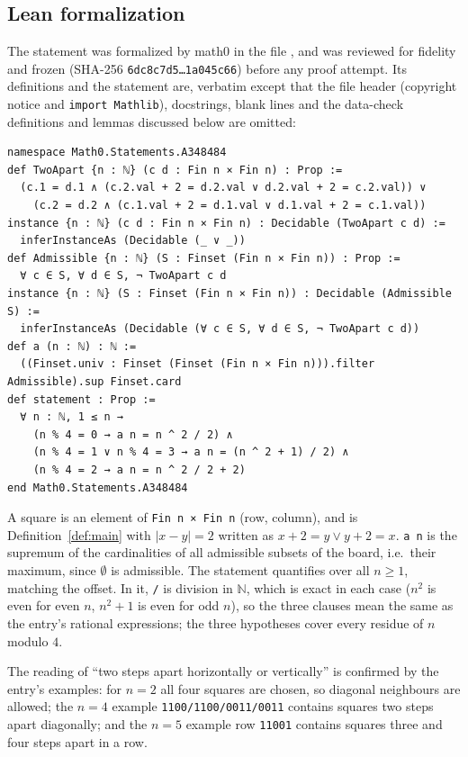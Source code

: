 \documentclass[11pt]{amsart}
\theoremstyle{plain}
\theoremstyle{definition}
\newcommand{\N}{\mathbb{N}}
\begin{document}
\subsection*{Lean formalization}
The statement was formalized by math0 in the file , and was reviewed for fidelity and frozen (SHA-256 \texttt{6dc8c7d5\ldots 1a045c66}) before any proof attempt.
Its definitions and the statement are, verbatim except that the file header (copyright notice and \texttt{import Mathlib}), docstrings, blank lines and the data-check definitions and lemmas discussed below are omitted:
\begin{lstlisting}
namespace Math0.Statements.A348484
def TwoApart {n : ℕ} (c d : Fin n × Fin n) : Prop :=
  (c.1 = d.1 ∧ (c.2.val + 2 = d.2.val ∨ d.2.val + 2 = c.2.val)) ∨
    (c.2 = d.2 ∧ (c.1.val + 2 = d.1.val ∨ d.1.val + 2 = c.1.val))
instance {n : ℕ} (c d : Fin n × Fin n) : Decidable (TwoApart c d) :=
  inferInstanceAs (Decidable (_ ∨ _))
def Admissible {n : ℕ} (S : Finset (Fin n × Fin n)) : Prop :=
  ∀ c ∈ S, ∀ d ∈ S, ¬ TwoApart c d
instance {n : ℕ} (S : Finset (Fin n × Fin n)) : Decidable (Admissible S) :=
  inferInstanceAs (Decidable (∀ c ∈ S, ∀ d ∈ S, ¬ TwoApart c d))
def a (n : ℕ) : ℕ :=
  ((Finset.univ : Finset (Finset (Fin n × Fin n))).filter Admissible).sup Finset.card
def statement : Prop :=
  ∀ n : ℕ, 1 ≤ n →
    (n % 4 = 0 → a n = n ^ 2 / 2) ∧
    (n % 4 = 1 ∨ n % 4 = 3 → a n = (n ^ 2 + 1) / 2) ∧
    (n % 4 = 2 → a n = n ^ 2 / 2 + 2)
end Math0.Statements.A348484
\end{lstlisting}
A square is an element of \texttt{Fin n × Fin n} (row, column), and  is Definition~\ref{def:main} with $|x-y|=2$ written as $x+2=y\lor y+2=x$.
\texttt{a n} is the supremum of the cardinalities of all admissible subsets of the board, i.e.\ their maximum, since $\emptyset$ is admissible.
The statement quantifies over all $n\ge1$, matching the offset.
In it, \texttt{/} is division in $\N$, which is exact in each case ($n^2$ is even for even $n$, $n^2+1$ is even for odd $n$), so the three clauses mean the same as the entry's rational expressions; the three hypotheses cover every residue of $n$ modulo $4$.

The reading of ``two steps apart horizontally or vertically'' is confirmed by the entry's examples: for $n=2$ all four squares are chosen, so diagonal neighbours are allowed; the $n=4$ example \texttt{1100/1100/0011/0011} contains squares two steps apart diagonally; and the $n=5$ example row \texttt{11001} contains squares three and four steps apart in a row.
\end{document}
